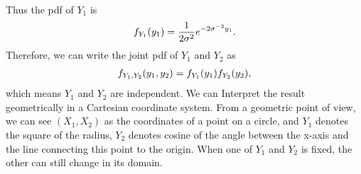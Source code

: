 \documentclass{article}
\begin{document}
\begin{CJK}{UTF8}{gbsn}
\begin{itemize}
\begin{align}
              \end{align}
              Thus the pdf of $Y_1$ is
              \begin{align}
                  f_{Y_1}(y_1) = \frac{1}{2\sigma^2}e^{-2\sigma^{-2} y_1}.\notag
              \end{align}
              Therefore, we can write the joint pdf of $Y_1$ and $Y_2$ as
              \begin{align}
                  f_{Y_1,Y_2}(y_1,y_2) = f_{Y_1}(y_1)f_{Y_2}(y_2),\notag
              \end{align}
              which means $Y_1$ and $Y_2$ are independent.
              We can Interpret the result geometrically in a Cartesian coordinate system.
              From a geometric point of view, we can see $(X_1, X_2)$ as the coordinates of a point
              on a circle, and $Y_1$ denotes the square of the radius, $Y_2$ denotes cosine of the angle
              between the x-axis and the line connecting this point to the origin.
              When one of $Y_1$ and $Y_2$ is fixed, the other can still change in its domain.
    \end{itemize}





\end{CJK}
\end{document}
